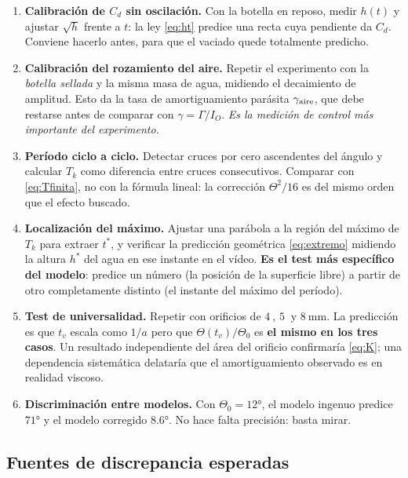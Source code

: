 \documentclass[11pt,a4paper]{article}
\begin{document}
\begin{enumerate}[label=\textbf{M\arabic*.},leftmargin=*,itemsep=3pt]
\item \textbf{Calibración de $C_d$ sin oscilación.} Con la botella en reposo, medir $h(t)$ y
ajustar $\sqrt{h}$ frente a $t$: la ley \eqref{eq:ht} predice una recta cuya pendiente da
$C_d$. Conviene hacerlo antes, para que el vaciado quede totalmente predicho.

\item \textbf{Calibración del rozamiento del aire.} Repetir el experimento con la \emph{botella
sellada} y la misma masa de agua, midiendo el decaimiento de amplitud. Esto da la tasa de
amortiguamiento parásita $\gamma_{\rm aire}$, que debe restarse antes de comparar con
$\gamma=\Gamma/I_O$. \emph{Es la medición de control más importante del experimento.}

\item \textbf{Período ciclo a ciclo.} Detectar cruces por cero ascendentes del ángulo y calcular
$T_k$ como diferencia entre cruces consecutivos. Comparar con \eqref{eq:Tfinita}, no con la
fórmula lineal: la corrección $\Theta^2/16$ es del mismo orden que el efecto buscado.

\item \textbf{Localización del máximo.} Ajustar una parábola a la región del máximo de $T_k$ para
extraer $t^\ast$, y verificar la predicción geométrica \eqref{eq:extremo} midiendo la altura
$h^\ast$ del agua en ese instante en el vídeo. \textbf{Es el test más específico del modelo}:
predice un número (la posición de la superficie libre) a partir de otro completamente distinto
(el instante del máximo del período).

\item \textbf{Test de universalidad.} Repetir con orificios de $\SI{4}{}$, $\SI{5}{}$ y
$\SI{8}{\milli\meter}$. La predicción es que $t_v$ escala como $1/a$ pero que
$\Theta(t_v)/\Theta_0$ es \textbf{el mismo en los tres casos}. Un resultado independiente del
área del orificio confirmaría \eqref{eq:K}; una dependencia sistemática delataría que el
amortiguamiento observado es en realidad viscoso.

\item \textbf{Discriminación entre modelos.} Con $\Theta_0=\ang{12}$, el modelo ingenuo predice
$\ang{71}$ y el modelo corregido $\ang{8.6}$. No hace falta precisión: basta mirar.
\end{enumerate}

\subsection{Fuentes de discrepancia esperadas}
\end{document}
